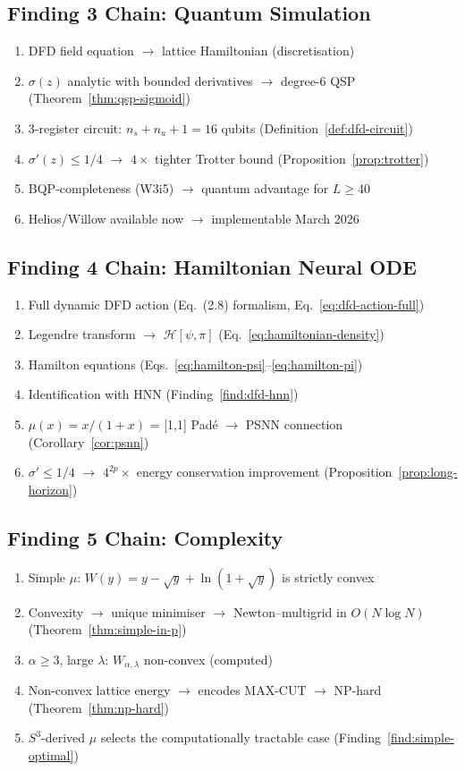 \documentclass[11pt]{article}
\theoremstyle{definition}
\theoremstyle{remark}
\begin{document}
\subsection{Finding 3 Chain: Quantum Simulation}

\begin{enumerate}[nosep]
\item DFD field equation $\to$ lattice Hamiltonian (discretisation)
\item $\sigma(z)$ analytic with bounded derivatives $\to$ degree-6 QSP (Theorem~\ref{thm:qsp-sigmoid})
\item 3-register circuit: $n_s + n_a + 1 = 16$ qubits (Definition~\ref{def:dfd-circuit})
\item $\sigma'(z) \leq 1/4$ $\to$ $4\times$ tighter Trotter bound (Proposition~\ref{prop:trotter})
\item BQP-completeness (W3i5) $\to$ quantum advantage for $L \geq 40$
\item Helios/Willow available now $\to$ implementable March 2026
\end{enumerate}

\subsection{Finding 4 Chain: Hamiltonian Neural ODE}

\begin{enumerate}[nosep]
\item Full dynamic DFD action (Eq.~(2.8) formalism, Eq.~\ref{eq:dfd-action-full})
\item Legendre transform $\to$ $\mathcal{H}[\psi, \pi]$ (Eq.~\ref{eq:hamiltonian-density})
\item Hamilton equations (Eqs.~\ref{eq:hamilton-psi}--\ref{eq:hamilton-pi})
\item Identification with HNN (Finding~\ref{find:dfd-hnn})
\item $\mu(x) = x/(1+x)$ = [1,1] Pad\'{e} $\to$ PSNN connection (Corollary~\ref{cor:psnn})
\item $\sigma' \leq 1/4$ $\to$ $4^{2p}\times$ energy conservation improvement (Proposition~\ref{prop:long-horizon})
\end{enumerate}

\subsection{Finding 5 Chain: Complexity}

\begin{enumerate}[nosep]
\item Simple $\mu$: $W(y) = y - \sqrt{y} + \ln(1+\sqrt{y})$ is strictly convex
\item Convexity $\to$ unique minimiser $\to$ Newton--multigrid in $O(N \log N)$ (Theorem~\ref{thm:simple-in-p})
\item $\alpha \geq 3$, large $\lambda$: $W_{\alpha,\lambda}$ non-convex (computed)
\item Non-convex lattice energy $\to$ encodes MAX-CUT $\to$ NP-hard (Theorem~\ref{thm:np-hard})
\item $S^3$-derived $\mu$ selects the computationally tractable case (Finding~\ref{find:simple-optimal})
\end{enumerate}
\end{document}
